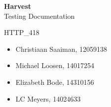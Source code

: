 \documentclass[11pt,fleqn]{book} %
\begin{document}

\begingroup
\thispagestyle{empty}
\centering
\vspace*{5cm}
\par\normalfont\fontsize{35}{35}\sffamily\selectfont
\textbf{Harvest}\\
{\LARGE Testing Documentation}\par %
\vspace*{0.5cm}
{\Huge HTTP\_418}\par
\centering
\vspace*{0.5cm}
\begin{itemize}[label={}, noitemsep]	
		\Large
		\item \begin{center} Christiaan Saaiman, 12059138 \end{center}
		\item \begin{center} Michael Loosen, 14017254 \end{center}
		\item \begin{center} Elizabeth Bode, 14310156 \end{center}
		\item \begin{center} LC Meyers, 14024633 \end{center}	
\end{itemize}
\endgroup



\pagestyle{empty} %

\tableofcontents %


\pagestyle{fancy} %

\end{document}

